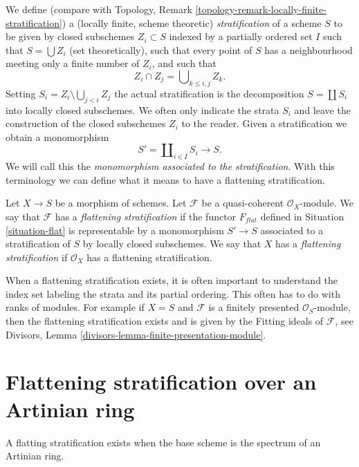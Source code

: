 \noindent
We define (compare with
Topology, Remark \ref{topology-remark-locally-finite-stratification})
a (locally finite, scheme theoretic) {\it stratification} of a scheme $S$
to be given by closed subschemes $Z_i \subset S$ indexed by a
partially ordered set $I$ such that
$S = \bigcup Z_i$ (set theoretically), such that every point of $S$ has
a neighbourhood meeting only a finite number of $Z_i$, and such that
$$
Z_i \cap Z_j = \bigcup\nolimits_{k \leq i, j} Z_k.
$$
Setting $S_i = Z_i \setminus \bigcup_{j < i} Z_j$ the actual
stratification is the decomposition $S = \coprod S_i$ into
locally closed subschemes. We often only indicate the strata
$S_i$ and leave the construction of the closed subschemes $Z_i$
to the reader. Given a stratification we obtain a monomorphism
$$
S' = \coprod\nolimits_{i \in I} S_i \longrightarrow S.
$$
We will call this the {\it monomorphism associated to the stratification}.
With this terminology we can define what it means to have a flattening
stratification.

\begin{definition}
\label{definition-flattening-stratification}
Let $X \to S$ be a morphism of schemes.
Let $\mathcal{F}$ be a quasi-coherent $\mathcal{O}_X$-module.
We say that $\mathcal{F}$ has a {\it flattening stratification}
if the functor $F_{flat}$ defined in Situation \ref{situation-flat}
is representable by a monomorphism $S' \to S$ associated
to a stratification of $S$ by locally closed subschemes.
We say that $X$ has a {\it flattening stratification}
if $\mathcal{O}_X$ has a flattening stratification.
\end{definition}

\noindent
When a flattening stratification exists, it is often important
to understand the index set labeling the strata and its partial ordering.
This often has to do with ranks of modules. For example if
$X = S$ and $\mathcal{F}$ is a finitely presented $\mathcal{O}_S$-module,
then the flattening stratification exists and is given by the Fitting ideals
of $\mathcal{F}$, see
Divisors, Lemma \ref{divisors-lemma-finite-presentation-module}.




\section{Flattening stratification over an Artinian ring}
\label{section-flattening-artinian}

\noindent
A flatting stratification exists when the base scheme is the spectrum
of an Artinian ring.

